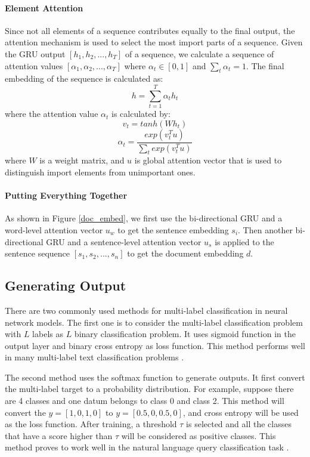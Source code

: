 \paragraph{Element Attention}
Since not all elements of a sequence contributes equally to the final output, the attention mechanism is used to select the most import parts of a sequence. Given the GRU output $[h_1, h_2, ..., h_T]$ of a sequence, we calculate a sequence of attention values $[\alpha_1, \alpha_2, ..., \alpha_T]$ where $\alpha_t \in [0, 1]$ and $\sum_t{\alpha_t}=1$. The final embedding of the sequence is calculated as:
\begin{equation}
h = \sum_{t=1}^{T}{\alpha_t h_t}
\label{seq_embed}
\end{equation}
where the attention value $\alpha_t$ is calculated by:
\begin{equation}
v_t = tanh(Wh_t)
\label{eq_att_transform}
\end{equation}
\begin{equation}
\alpha_t=\frac{exp(v_t^T u)}{\sum_t{exp(v_t^T u)}}
\label{gen_att}
\end{equation}
where $W$ is a weight matrix, and $u$ is global attention vector that is used to distinguish import elements from unimportant ones. 

\paragraph{Putting Everything Together}
As shown in Figure \ref{doc_embed}, we first use the bi-directional GRU and a word-level attention vector $u_w$ to get the sentence embedding $s_i$. Then another bi-directional GRU and a sentence-level attention vector $u_s$ is applied to the sentence sequence $[s_1, s_2, ..., s_n]$ to get the document embedding $d$.

\subsection{Generating Output}
There are two commonly used methods for multi-label classification in neural network models. The first one is to consider the multi-label classification problem with $L$ labels as $L$ binary classification problem. It uses sigmoid function in the output layer and binary cross entropy as loss function. This method performs well in many multi-label text classification problems \cite{nam2014large}.

The second method uses the softmax function to generate outputs. It first convert the multi-label target to a probability distribution. For example, suppose there are 4 classes and one datum belongs to class 0 and class 2. This method will convert the $y=[1, 0, 1, 0]$ to $y=[0.5, 0, 0.5, 0]$, and cross entropy will be used as the loss function. After training, a threshold $\tau$ is selected and all the classes that have a score higher than $\tau$ will be considered as positive classes. This method proves to work well in the natural language query classification task \cite{kurata2016improved}. 

